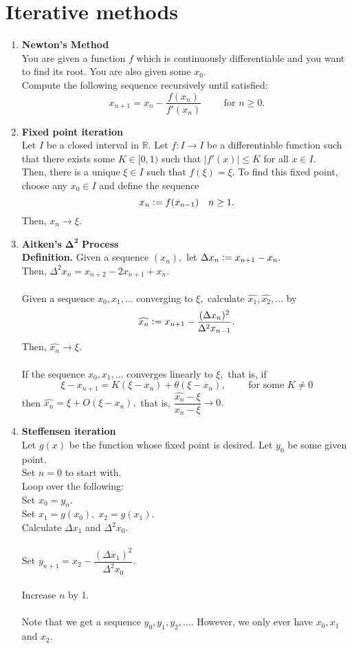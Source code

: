 \documentclass[12pt]{article}
\theoremstyle{definition}
\begin{document}
\section{Iterative methods}
\begin{enumerate} 
	\itemsep1em
	\item \textbf{Newton's Method} \\
	You are given a function $f$ which is continuously differentiable and you want to find its root. You are also given some $x_0.$\\
	Compute the following sequence recursively until satisfied:
	\[x_{n+1} = x_n - \frac{f(x_n)}{f'(x_n)} \qquad \text{ for } n \ge 0.\]
	\item \textbf{Fixed point iteration}\\
	Let $I$ be a closed interval in $\mathbb{R}.$ Let $f:I\to I$ be a differentiable function such that there exists some $K \in [0, 1)$ such that $|f'(x)| \le K$ for all $x \in I.$\\
	Then, there is a unique $\xi \in I$ such that $f(\xi) = \xi.$ To find this fixed point, choose any $x_0 \in I$ and define the sequence
	\[x_n \vcentcolon= f(x_{n-1}) \quad n \ge 1.\]
	Then, $x_n \to \xi.$
	\item \textbf{Aitken's} $\mathbf{\Delta^2}$ \textbf{Process}\\
	\textbf{Definition.} Given a sequence $(x_n),$ let $\Delta x_n \vcentcolon= x_{n+1} - x_n.$\\
	Then, $\Delta^2x_n = x_{n+2} - 2x_{n+1} + x_n.$\\~\\
	
	Given a sequence $x_0, x_1, \ldots$ converging to $\xi,$ calculate $\widehat{x_1}, \widehat{x_2}, \ldots$ by
	\[\widehat{x_n} \vcentcolon= x_{n+1} - \frac{(\Delta x_n)^2}{\Delta^2x_{n-1}}.\]
	Then, $\widehat{x_n} \to \xi.$\\~\\
	If the sequence $x_0, x_1, \ldots$ converges linearly to $\xi,$ that is, if
	\[\xi - x_{n+1} = K(\xi - x_n) + \theta(\xi - x_n), \qquad \text{ for some } K \neq 0\]
	then $\widehat{x_n} = \xi + O(\xi - x_n),$ that is, $\dfrac{\widehat{x_n} - \xi}{x_n - \xi} \to 0.$
	\item \textbf{Steffensen iteration}\\
	Let $g(x)$ be the function whose fixed point is desired. Let $y_0$ be some given point.\\
	Set $n = 0$ to start with.\\
	Loop over the following:\\
	Set $x_0 = y_n.$\\
	Set $x_1 = g(x_0),\;x_2 = g(x_1).$\\
	Calculate $\Delta x_1$ and $\Delta^2x_0.$\\~\\
	Set $y_{n+1} = x_2 - \dfrac{(\Delta x_1)^2}{\Delta^2x_0}.$\\~\\
	Increase $n$ by 1.\\~\\
	Note that we get a sequence $y_0, y_1, y_2, \ldots.$ However, we only ever have $x_0, x_1$ and $x_2.$
\end{enumerate}
\end{document}
